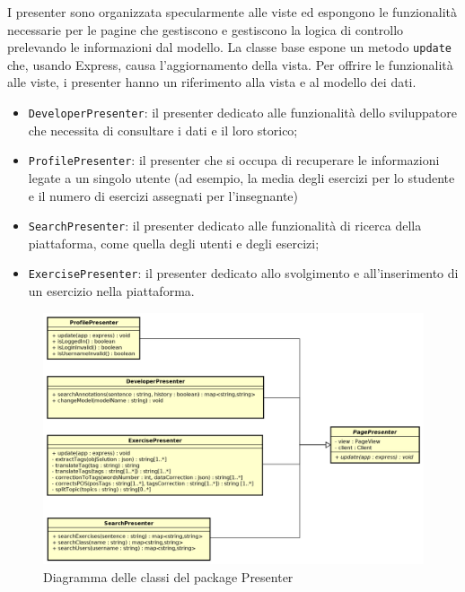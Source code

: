 I presenter sono organizzata specularmente alle viste ed espongono le funzionalità necessarie per le pagine che gestiscono e gestiscono la logica di controllo prelevando le informazioni dal modello. La classe base espone un metodo \texttt{update} che, usando Express, causa l'aggiornamento della vista. Per offrire le funzionalità alle viste, i presenter hanno un riferimento alla vista e al modello dei dati.
\begin{itemize}
	\item \texttt{DeveloperPresenter}: il presenter dedicato alle funzionalità dello sviluppatore che necessita di consultare i dati e il loro storico;
	\item \texttt{ProfilePresenter}: il presenter che si occupa di recuperare le informazioni legate a un singolo utente (ad esempio, la media degli esercizi per lo studente e il numero di esercizi assegnati per l'insegnante)
	\item \texttt{SearchPresenter}: il presenter dedicato alle funzionalità di ricerca della piattaforma, come quella degli utenti e degli esercizi;
	\item \texttt{ExercisePresenter}: il presenter dedicato allo svolgimento e all'inserimento di un esercizio nella piattaforma.
\end{itemize}

\begin{figure}[h]
	\includegraphics[scale=0.53]{images/Presenter.png}
	\caption{Diagramma delle classi del package Presenter}
\end{figure}
